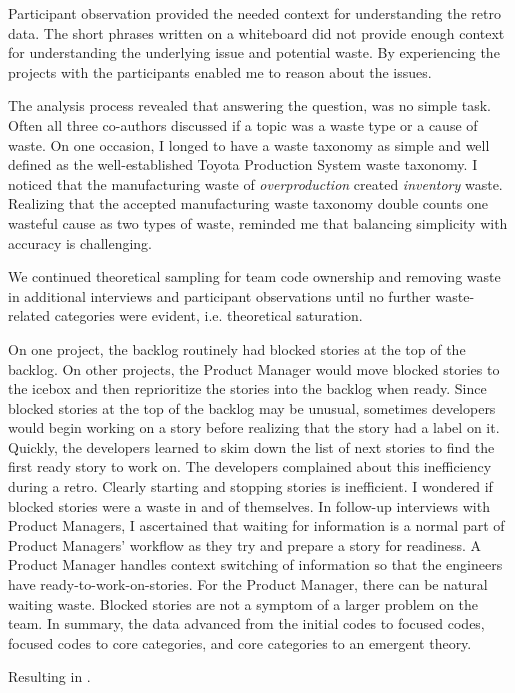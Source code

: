 Participant observation provided the needed context for understanding the retro data. The short phrases written on a whiteboard did not provide enough context for understanding the underlying issue and potential waste. By experiencing the projects with the participants enabled me to reason about the issues. 

The analysis process revealed that answering the question,  was no simple task. Often all three co-authors discussed if a topic was a waste type or a cause of waste. On one occasion, I longed to have a waste taxonomy as simple and well defined as the well-established Toyota Production System waste taxonomy. I noticed that the manufacturing waste of \textit{overproduction} created \textit{inventory} waste. Realizing that the accepted manufacturing waste taxonomy double counts one wasteful cause as two types of waste, reminded me that balancing simplicity with accuracy is challenging. 

We continued theoretical sampling for team code ownership and removing waste in additional interviews and participant observations until no further waste-related categories were evident, i.e. theoretical saturation. 

On one project, the backlog routinely had blocked stories at the top of the backlog. On other projects, the Product Manager would move blocked stories to the icebox and then reprioritize the stories into the backlog when ready. Since blocked stories at the top of the backlog may be unusual, sometimes developers would begin working on a story before realizing that the story had a  label on it. Quickly, the developers learned to skim down the list of next stories to find the first ready story to work on. The developers complained about this inefficiency during a retro. Clearly starting and stopping stories is inefficient. I wondered if blocked stories were a waste in and of themselves. In follow-up interviews with Product Managers, I ascertained that waiting for information is a normal part of Product Managers’ workflow as they try and prepare a story for readiness. A Product Manager handles context switching of information so that the engineers have ready-to-work-on-stories. For the Product Manager, there can be natural waiting waste. Blocked stories are not a symptom of a larger problem on the team.
In summary, the data advanced from the initial codes to focused codes, focused codes to core categories, and core categories to an emergent theory. 

Resulting in \cite{SedanoSoftwareDevelopmentWaste}.
